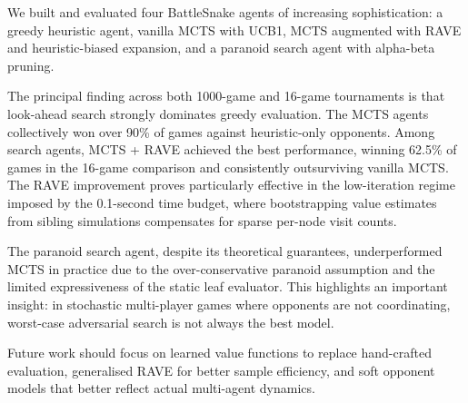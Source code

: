 \documentclass[12pt,a4paper]{article}
\begin{document}
We built and evaluated four BattleSnake agents of increasing sophistication: a greedy heuristic agent, vanilla MCTS with UCB1, MCTS augmented with RAVE and heuristic-biased expansion, and a paranoid search agent with alpha-beta pruning.

The principal finding across both 1000-game and 16-game tournaments is that look-ahead search strongly dominates greedy evaluation. The MCTS agents collectively won over 90\% of games against heuristic-only opponents. Among search agents, MCTS + RAVE achieved the best performance, winning 62.5\% of games in the 16-game comparison and consistently outsurviving vanilla MCTS. The RAVE improvement proves particularly effective in the low-iteration regime imposed by the 0.1-second time budget, where bootstrapping value estimates from sibling simulations compensates for sparse per-node visit counts.

The paranoid search agent, despite its theoretical guarantees, underperformed MCTS in practice due to the over-conservative paranoid assumption and the limited expressiveness of the static leaf evaluator. This highlights an important insight: in stochastic multi-player games where opponents are not coordinating, worst-case adversarial search is not always the best model.

Future work should focus on learned value functions to replace hand-crafted evaluation, generalised RAVE for better sample efficiency, and soft opponent models that better reflect actual multi-agent dynamics.



\end{document}
